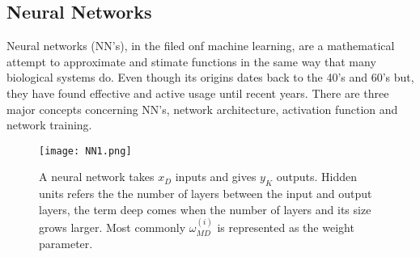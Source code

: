 \subsection{Neural Networks}
Neural networks (NN's), in the filed onf machine learning, are a mathematical attempt to approximate and stimate functions in the same way that many biological systems do. Even though its origins dates back to the 40's and 60's but, they have found effective and active usage until recent years. There are three major concepts concerning NN's, network architecture, activation function and network training.
\begin{figure}[tb] 
\centering 
\texttt{[image: NN1.png]} 
\caption[Neural network example architecture]{A neural network takes $x_D$ inputs and gives $y_K$ outputs. Hidden units refers the the number of layers between the input and output layers, the term deep comes when the number of layers and its size grows larger. Most commonly $\omega_{MD}^{(i)}$ is represented as the weight parameter.}
\label{fig:NNim1} 
\end{figure} 
